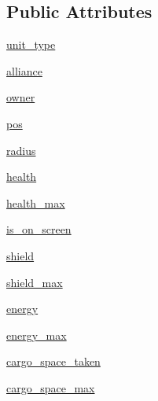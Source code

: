 \subsection*{Public Attributes}
\begin{DoxyCompactItemize}
\item 
\mbox{\hyperlink{classpysc2_1_1tests_1_1dummy__observation_1_1_feature_unit_a6a9aea1b01b0bef42000625eddd10014}{unit\+\_\+type}}
\item 
\mbox{\hyperlink{classpysc2_1_1tests_1_1dummy__observation_1_1_feature_unit_a36f00d3e41958c8cdc28475030b3c8ca}{alliance}}
\item 
\mbox{\hyperlink{classpysc2_1_1tests_1_1dummy__observation_1_1_feature_unit_a19974dba093e0d15e69c4d3a791a351e}{owner}}
\item 
\mbox{\hyperlink{classpysc2_1_1tests_1_1dummy__observation_1_1_feature_unit_a7c8159cf661d25eb9b130b5209b8b6b2}{pos}}
\item 
\mbox{\hyperlink{classpysc2_1_1tests_1_1dummy__observation_1_1_feature_unit_aa77c7afeb2b7b2f1126b45c800447123}{radius}}
\item 
\mbox{\hyperlink{classpysc2_1_1tests_1_1dummy__observation_1_1_feature_unit_afa837c7dc75f853f013d5ce4ccac5762}{health}}
\item 
\mbox{\hyperlink{classpysc2_1_1tests_1_1dummy__observation_1_1_feature_unit_a33704cb99306a4827b4e4e0ca3398ac8}{health\+\_\+max}}
\item 
\mbox{\hyperlink{classpysc2_1_1tests_1_1dummy__observation_1_1_feature_unit_ad9a4ffd45f7af2c034c5463496e12795}{is\+\_\+on\+\_\+screen}}
\item 
\mbox{\hyperlink{classpysc2_1_1tests_1_1dummy__observation_1_1_feature_unit_ab551432b8b74984fbf45c160bc3fa216}{shield}}
\item 
\mbox{\hyperlink{classpysc2_1_1tests_1_1dummy__observation_1_1_feature_unit_a2741bc9f9169631f189e4147ce0ec834}{shield\+\_\+max}}
\item 
\mbox{\hyperlink{classpysc2_1_1tests_1_1dummy__observation_1_1_feature_unit_ae008fd2fe0f833f0fdeac21a2e572908}{energy}}
\item 
\mbox{\hyperlink{classpysc2_1_1tests_1_1dummy__observation_1_1_feature_unit_a29a4b2b63ee5fa9f0b19c95615f73c52}{energy\+\_\+max}}
\item 
\mbox{\hyperlink{classpysc2_1_1tests_1_1dummy__observation_1_1_feature_unit_a31a95dbb0529fd0367f93e6446119107}{cargo\+\_\+space\+\_\+taken}}
\item 
\mbox{\hyperlink{classpysc2_1_1tests_1_1dummy__observation_1_1_feature_unit_a4b4308329ef1e737110a2677ef70c9c1}{cargo\+\_\+space\+\_\+max}}

\end{DoxyCompactItemize}
